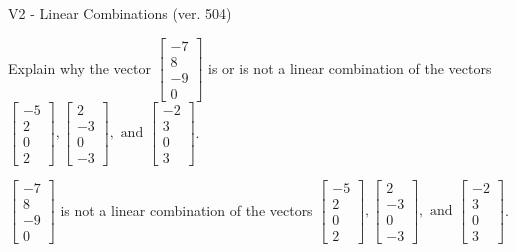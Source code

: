 \begin{exercise}
  \begin{exerciseTitle}V2 - Linear Combinations (ver. 504)\end{exerciseTitle}
  \begin{exerciseStatement}
    Explain why the vector \(\left[\begin{array}{c}
-7 \\
8 \\
-9 \\
0
\end{array}\right]\)  is or is not a linear 
	combination of the vectors \(\left[\begin{array}{c}
-5 \\
2 \\
0 \\
2
\end{array}\right] , \left[\begin{array}{c}
2 \\
-3 \\
0 \\
-3
\end{array}\right] , \text{ and } \left[\begin{array}{c}
-2 \\
3 \\
0 \\
3
\end{array}\right]\).
	


  \end{exerciseStatement}
  \begin{exerciseAnswer}
   \(\left[\begin{array}{c}
-7 \\
8 \\
-9 \\
0
\end{array}\right]\) 
  	 is not  
	a linear combination of the vectors \(\left[\begin{array}{c}
-5 \\
2 \\
0 \\
2
\end{array}\right] , \left[\begin{array}{c}
2 \\
-3 \\
0 \\
-3
\end{array}\right] , \text{ and } \left[\begin{array}{c}
-2 \\
3 \\
0 \\
3
\end{array}\right]\).

	
  


  \end{exerciseAnswer}
\end{exercise}